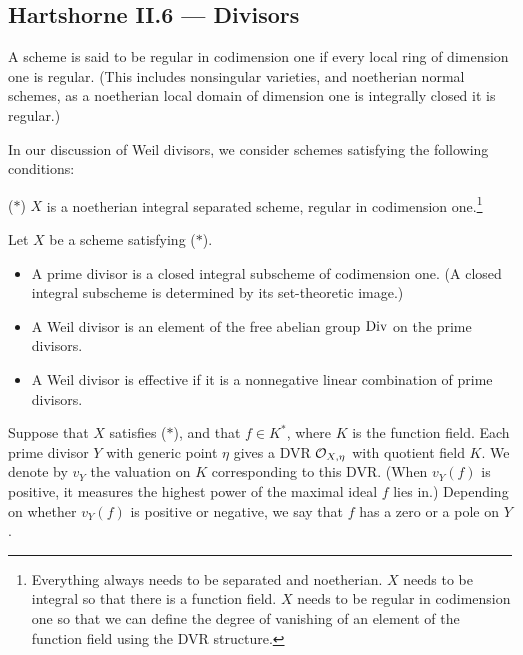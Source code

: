 \documentclass[11pt]{article}
\begin{document}
\begin{II.6 Divisors}
\section*{Hartshorne II.6 --- Divisors}
\begin{itemise}
\item A scheme is said to be regular in
codimension one if every local ring of dimension one is regular. {\small (This
includes nonsingular varieties, and noetherian normal schemes, as a noetherian
local domain of dimension one is integrally closed \Iff it is regular.)}
\item In our discussion of Weil divisors, we consider schemes satisfying the
following conditions:
\begin{itemise}
\item[($*$)] $X$ is a noetherian integral separated scheme, regular in
codimension one.\footnote{Everything always needs to be separated and
noetherian. $X$ needs to be integral so that there is a function field. $X$
needs to be regular in codimension one so that we can define the degree of
vanishing of an element of the function field using the DVR
structure.}
\end{itemise}
\item Let $X$ be a scheme satisfying ($*$). 
\begin{itemize}\squishlist
\item A prime divisor is a closed integral subscheme of
codimension one. {\small (A closed integral subscheme is determined by its
set-theoretic image.)}
\item A  Weil divisor is an element of the free abelian
group $\operatorname{{Div}}$ on the prime divisors.
\item A Weil divisor is effective  if it is a
nonnegative linear combination of prime divisors.
\end{itemize}
\item Suppose that $X$ satisfies ($*$), and that $f\in K^*$, where $K$ is the
function field. Each prime divisor $Y$ with generic point $\eta$ gives a DVR
$\mathcal{O}_{X,\eta}$ with quotient field $K$. We denote by $v_Y$ the valuation on
$K$ corresponding to this DVR. {\small (When $v_Y(f)$ is positive, it measures
the highest power of the maximal ideal $f$ lies in.)} Depending on whether
$v_Y(f)$ is positive or negative, we say that $f$ has a zero or a pole on $Y$.

\end{itemise}
\end{II.6 Divisors}
\end{document}
